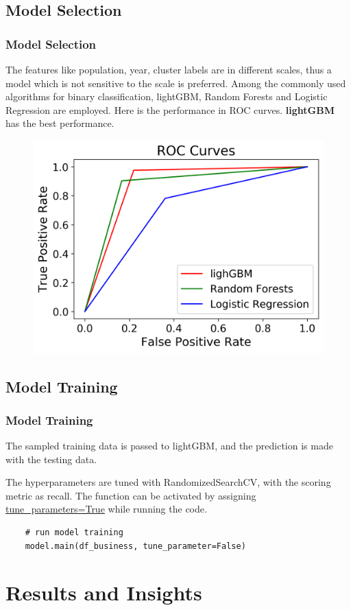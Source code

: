 \documentclass{beamer}
\begin{document}
\subsection{Model Selection}
\begin{frame}
\frametitle{Model Selection}
The features like population, year, cluster labels are in different scales, thus a model which is not sensitive to the scale is preferred. Among the commonly used algorithms for binary classification, lightGBM, Random Forests and Logistic Regression are employed. Here is the performance in ROC curves. \textbf{lightGBM} has the best performance.
\begin{figure}
	\includegraphics[width=.65\textwidth]{roc}
\end{figure}

\end{frame}
\subsection{Model Training}
\begin{frame}[fragile]
\frametitle{Model Training}
The sampled training data is passed to lightGBM, and the prediction is made with the testing data. \vspace{1em}

The hyperparameters are tuned with RandomizedSearchCV, with the scoring metric as recall. The function can be activated by assigning  \underline{tune\_parameters=True} while running the code.\vspace{1em}

\begin{lstlisting}
	# run model training
	model.main(df_business, tune_parameter=False)
\end{lstlisting}
\end{frame}
\section{Results and Insights}
\end{document}
